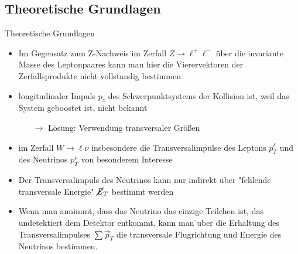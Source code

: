 \documentclass[aspectratio=1610, 9pt]{beamer}
\begin{document}
\subsection{Theoretische Grundlagen}
\begin{frame}{Theoretische Grundlagen}
   \begin{itemize}
     \item Im Gegensatz zum Z-Nachweis im Zerfall $Z \rightarrow \ell^+ \ell^-$ über die invariante Masse des Leptonpaares kann man hier die Vierervektoren der Zerfallsprodukte nicht vollstandig bestimmen
     \item longitudinaler Impuls $p_z$ des Schwerpunktsystems der Kollision ist, weil das System geboostet ist, nicht bekannt \\
     \begin{itemize}
       \item[$\rightarrow$] Lösung: Verwendung transversaler Größen
     \end{itemize}
   \end{itemize}
\end{frame}

\begin{frame}
  \begin{itemize}
    \item im Zerfall $W \rightarrow \ell \nu$ insbesondere die Transversalimpulse des Leptons $p^\ell_T$ und des Neutrinos $p^\nu_T$ von besonderem Interesse
    \item Der Transversalimpuls des Neutrinos kann nur indirekt über "fehlende transversale Energie"  $\cancel{\it{E}}_{T}$ bestimmt werden
    \item Wenn man annimmt, dass das Neutrino das einzige Teilchen ist, das undetektiert dem Detektor entkommt, kann man ̈uber die Erhaltung des Transversalimpulses $\sum \vec{p}_T$ die transversale Flugrichtung und Energie des Neutrinos bestimmen.
  \end{itemize}
\end{frame}
\end{document}
